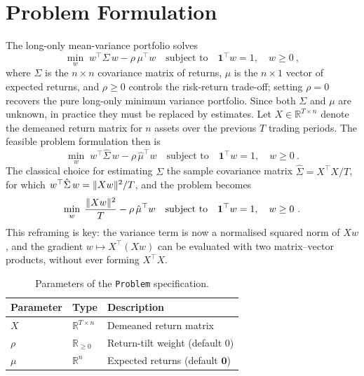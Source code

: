 \section{Problem Formulation}\label{sec:problem}
The long-only mean-variance portfolio solves
\[
\min_{w}\; w^\top\Sigma\, w - \rho\,\mu^\top w
\quad\text{subject to}\quad
\mathbf{1}^\top w = 1,\quad w\geq 0~,
\]
where $\Sigma$ is the $n\times n$ covariance matrix of returns, $\mu$ is the $n\times 1$ vector of expected returns, and $\rho\geq 0$ controls the risk-return trade-off; setting $\rho=0$ recovers the pure long-only minimum variance portfolio.
Since both $\Sigma$ and
$\mu$ are unknown, in practice they must be replaced by estimates. Let $X\in\mathbb{R}^{T\times n}$ denote the demeaned return matrix for $n$ assets over the previous $T$ trading periods. The feasible problem formulation then is
\[
\min_{w}\; w^\top\hat\Sigma\, w - \rho\,\hat\mu^\top w
\quad\text{subject to}\quad
\mathbf{1}^\top w = 1,\quad w\geq 0~.
\]
The classical choice for estimating $\Sigma$
the sample covariance matrix $\hat\Sigma = X^\top X/T$, for which $w^\top\hat\Sigma\, w = \lVert Xw \rVert^2/T$, and the problem becomes
\[
\min_{w}\;\frac{\lVert Xw \rVert^2}{T} - \rho\,\hat\mu^\top w
\quad\text{subject to}\quad
\mathbf{1}^\top w = 1,\quad w\geq 0~.
\]
This reframing is key: the variance term is now a normalised squared norm of $Xw$, and the gradient $w\mapsto X^\top(Xw)$ can be evaluated with two matrix--vector products, without ever forming $X^\top X$.

\begin{table}[ht]
\centering
\begin{tabular}{lll}
\toprule
Parameter & Type & Description \\
\midrule
$X$        & $\mathbb{R}^{T \times n}$ & Demeaned return matrix \\
$\rho$     & $\mathbb{R}_{\geq 0}$     & Return-tilt weight (default $0$) \\
$\mu$      & $\mathbb{R}^n$            & Expected returns (default $\mathbf{0}$) \\
\bottomrule
\end{tabular}
\caption{Parameters of the \texttt{Problem} specification.}
\label{tab:params}
\end{table}

